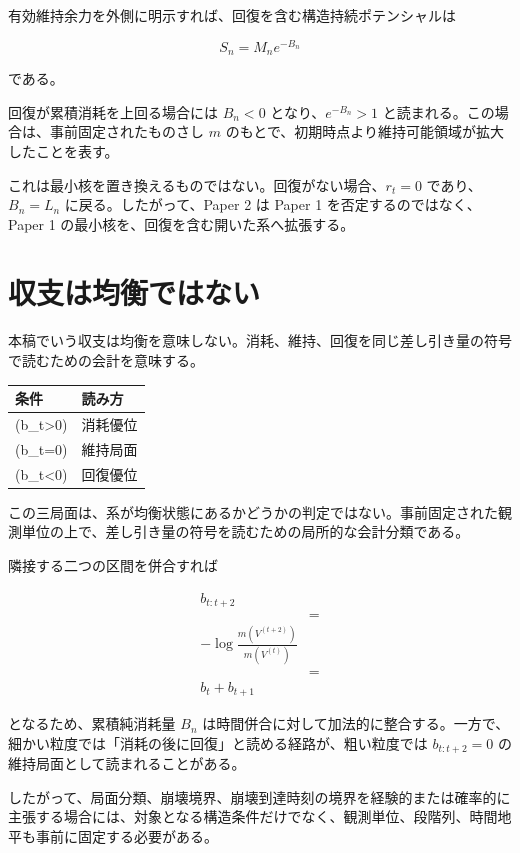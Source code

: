 \documentclass[12pt,a4paper]{article}
\begin{document}
有効維持余力を外側に明示すれば、回復を含む構造持続ポテンシャルは

\[
S_{n}=M_{n} e^{-B_{n}}
\]

である。

回復が累積消耗を上回る場合には \(B_{n}<0\) となり、\(e^{-B_{n}}>1\) と読まれる。この場合は、事前固定されたものさし \(m\) のもとで、初期時点より維持可能領域が拡大したことを表す。

これは最小核を置き換えるものではない。回復がない場合、\(r_{t}=0\) であり、\(B_{n}=L_{n}\) に戻る。したがって、Paper 2 は Paper 1 を否定するのではなく、Paper 1 の最小核を、回復を含む開いた系へ拡張する。

\section{収支は均衡ではない}\label{ux53ceux652fux306fux5747ux8861ux3067ux306fux306aux3044}

本稿でいう収支は均衡を意味しない。消耗、維持、回復を同じ差し引き量の符号で読むための会計を意味する。

{\def\LTcaptype{table} %
\begin{longtable}[]{@{}ll@{}}
\toprule\noalign{}
条件 & 読み方 \\
\midrule\noalign{}
\endhead
\bottomrule\noalign{}
\endlastfoot
(b\_t\textgreater0) & 消耗優位 \\
(b\_t=0) & 維持局面 \\
(b\_t\textless0) & 回復優位 \\
\end{longtable}
}

この三局面は、系が均衡状態にあるかどうかの判定ではない。事前固定された観測単位の上で、差し引き量の符号を読むための局所的な会計分類である。

隣接する二つの区間を併合すれば

\[
\begin{aligned}
b_{t:t+2} \\
&= \\
-\log\frac{m(V^{(t+2)})}{m(V^{(t)})} \\
&= \\
b_{t}+b_{t+1}
\end{aligned}
\]

となるため、累積純消耗量 \(B_{n}\) は時間併合に対して加法的に整合する。一方で、細かい粒度では「消耗の後に回復」と読める経路が、粗い粒度では \(b_{t:t+2}=0\) の維持局面として読まれることがある。

したがって、局面分類、崩壊境界、崩壊到達時刻の境界を経験的または確率的に主張する場合には、対象となる構造条件だけでなく、観測単位、段階列、時間地平も事前に固定する必要がある。
\end{document}
